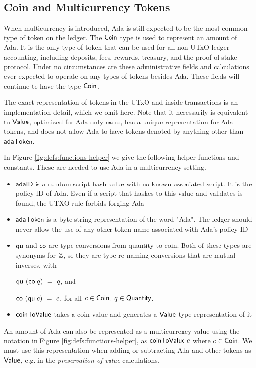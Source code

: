 \subsection*{Coin and Multicurrency Tokens}
When multicurrency is introduced, Ada is still expected to be
the most common type of token on the ledger.
The $\mathsf{Coin}$ type is used to represent an amount of Ada.
It is the only
type of token that can be used for all non-UTxO ledger accounting, including deposits,
fees, rewards, treasury, and the proof of stake protocol. Under no circumstances
are these administrative fields and calculations ever expected to operate on
any types of tokens besides Ada. These fields will continue to have the type $\mathsf{Coin}$.

The exact representation of tokens in the UTxO and inside transactions
is an implementation detail, which we omit here.
Note that it necessarily is equivalent to $\mathsf{Value}$, optimized
for Ada-only cases, has a unique representation for Ada tokens,
and does not allow Ada to have tokens denoted by anything other than $\mathsf{adaToken}$.

In Figure \ref{fig:defs:functions-helper} we give the following helper functions
and constants.  These are needed to use Ada in a multicurrency setting.

\begin{itemize}
  \item $\mathsf{adaID}$ is a random script hash value with no known associated
  script. It is the policy ID of Ada. Even if a
  script that hashes to this value
  and validates is found, the UTXO rule forbids forging Ada
  \item $\mathsf{adaToken}$ is a byte string representation of the word "Ada".
  The ledger should never allow the use of any other token name associated
  with Ada's policy ID
  \item $\mathsf{qu}$ and $\mathsf{co}$ are type conversions from quantity to
  coin. Both of these types are synonyms for $\mathbb{Z}$, so they are
  type re-naming conversions that are mutual inverses, with

  $\mathsf{qu} ~(\mathsf{co} ~q )~= ~q$, and

  $\mathsf{co}~ (\mathsf{qu}~ c) ~=~ c$, for all $c \in \mathsf{Coin},~q \in \mathsf{Quantity}$.

  \item $\mathsf{coinToValue}$ takes a coin value and generates a $\mathsf{Value}$ type representation
  of it
\end{itemize}

An amount of Ada can also be represented as a multicurrency value
using the notation in Figure \ref{fig:defs:functions-helper}, as
$\mathsf{coinToValue}~c$ where $c \in \mathsf{Coin}$. We must use this representation
when adding or subtracting Ada and other tokens as $\mathsf{Value}$, e.g. in the
\emph{preservation of value} calculations.

